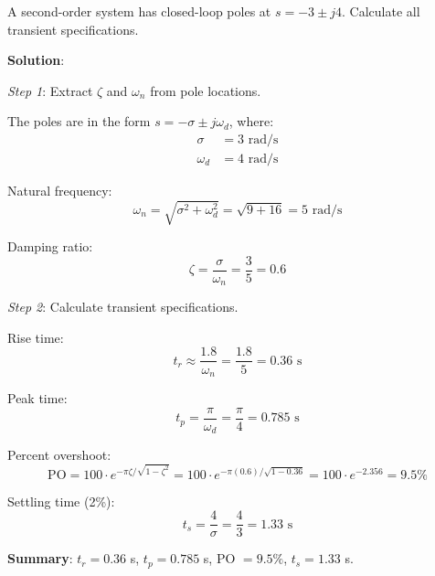 \begin{examplebox}
A second-order system has closed-loop poles at $s = -3 \pm j4$. Calculate all transient specifications.

\textbf{Solution}:

\textit{Step 1}: Extract $\zeta$ and $\omega_n$ from pole locations.

The poles are in the form $s = -\sigma \pm j\omega_d$, where:
\begin{align}
    \sigma &= 3 \text{ rad/s} \\
    \omega_d &= 4 \text{ rad/s}
\end{align}

Natural frequency:
\begin{equation}
    \omega_n = \sqrt{\sigma^2 + \omega_d^2} = \sqrt{9 + 16} = 5 \text{ rad/s}
\end{equation}

Damping ratio:
\begin{equation}
    \zeta = \frac{\sigma}{\omega_n} = \frac{3}{5} = 0.6
\end{equation}

\textit{Step 2}: Calculate transient specifications.

Rise time:
\begin{equation}
    t_r \approx \frac{1.8}{\omega_n} = \frac{1.8}{5} = 0.36 \text{ s}
\end{equation}

Peak time:
\begin{equation}
    t_p = \frac{\pi}{\omega_d} = \frac{\pi}{4} = 0.785 \text{ s}
\end{equation}

Percent overshoot:
\begin{equation}
    \text{PO} = 100 \cdot e^{-\pi\zeta/\sqrt{1-\zeta^2}} = 100 \cdot e^{-\pi(0.6)/\sqrt{1-0.36}} = 100 \cdot e^{-2.356} = 9.5\%
\end{equation}

Settling time (2\%):
\begin{equation}
    t_s = \frac{4}{\sigma} = \frac{4}{3} = 1.33 \text{ s}
\end{equation}

\textbf{Summary}: $t_r = 0.36$ s, $t_p = 0.785$ s, PO $= 9.5\%$, $t_s = 1.33$ s.
\end{examplebox}

\vspace{1em}

